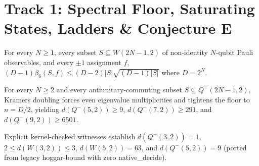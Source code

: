
\section{Track 1: Spectral Floor, Saturating States, Ladders \& Conjecture E}

\begin{theorem}
\label{thm:spectral-floor}
\leanok
For every $N \ge 1$, every subset $S \subseteq W(2N-1,2)$ of non-identity $N$-qubit Pauli observables, and every $\pm 1$ assignment $f$, $(D-1)\beta_6(S,f) \le (D-2)|S|\sqrt{(D-1)|S|}$ where $D = 2^N$.
\end{theorem}

\begin{theorem}
\label{thm:kramers-floor}
\leanok
For every $N \ge 2$ and every antiunitary-commuting subset $S \subseteq Q^-(2N-1,2)$, Kramers doubling forces even eigenvalue multiplicities and tightens the floor to $n = D/2$, yielding $d(Q^-(5,2)) \ge 9$, $d(Q^-(7,2)) \ge 291$, and $d(Q^-(9,2)) \ge 6501$.
\end{theorem}

\begin{theorem}
\label{thm:small-witnesses}
\leanok
Explicit kernel-checked witnesses establish $d(Q^+(3,2)) = 1$, $2 \le d(W(3,2)) \le 3$, $d(W(5,2)) = 63$, and $d(Q^-(5,2)) = 9$ (ported from legacy hoggar-bound with zero native\_decide).
\end{theorem}

